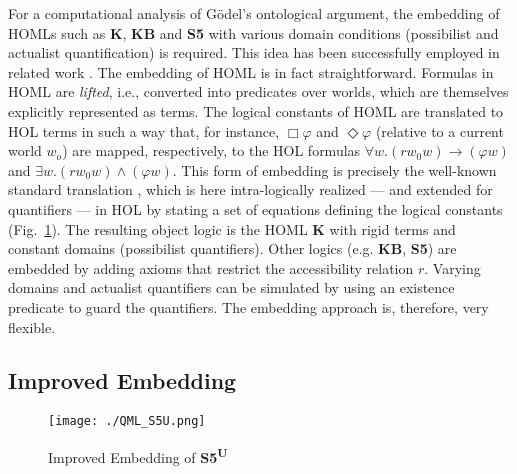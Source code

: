 \documentclass{article}
\newcommand{\logic}[1]{\textbf{#1}\xspace}
\newcommand{\SFiveU}{\logic{S5\textsuperscript{U}}}
\newcommand{\imp}{{\rightarrow}}
\begin{document}

For a computational analysis of G\"odel's ontological argument, the embedding of HOMLs such as \textbf{K},
\textbf{KB} and \textbf{S5} with various domain conditions (possibilist and actualist quantification)
is required. This idea has been successfully employed in related work
\cite{C40}. The embedding of HOML is in fact
straightforward. Formulas in HOML are \emph{lifted}, i.e., converted into predicates
over worlds, which are themselves explicitly represented as
terms. The logical constants of HOML are translated to HOL terms in such a way that, for instance, 
$\Box \varphi$ and $\Diamond \varphi$ (relative to a current world
$w_o$) are mapped, respectively, to the HOL formulas
$\forall w. (r w_0 w) \imp (\varphi w)$ and
$\exists w. (r w_0 w) \wedge (\varphi w)$. This form of embedding is
precisely the well-known standard translation
\cite{DBLP:journals/logcom/Ohlbach91}, which is here intra-logically
realized --- and extended for quantifiers --- in HOL by stating a set
of equations defining the logical constants (Fig.~\ref{QML_S5U}). The
resulting object logic is the HOML \textbf{K} with rigid terms and constant
domains (possibilist quantifiers). Other logics (e.g. \textbf{KB}, \textbf{S5}) are
embedded by adding axioms that restrict the accessibility relation
$r$. Varying domains and actualist quantifiers can be simulated by using
 an existence predicate to guard the
quantifiers. The embedding approach is, therefore, very flexible.


\subsection{Improved Embedding}\label{sec:improvedembedding}
\begin{figure}[t]
\centerline{\texttt{[image: ./QML\_S5U.png]}}
\caption{Improved Embedding of \SFiveU} \label{QML_S5U}
\end{figure}
\end{document}
